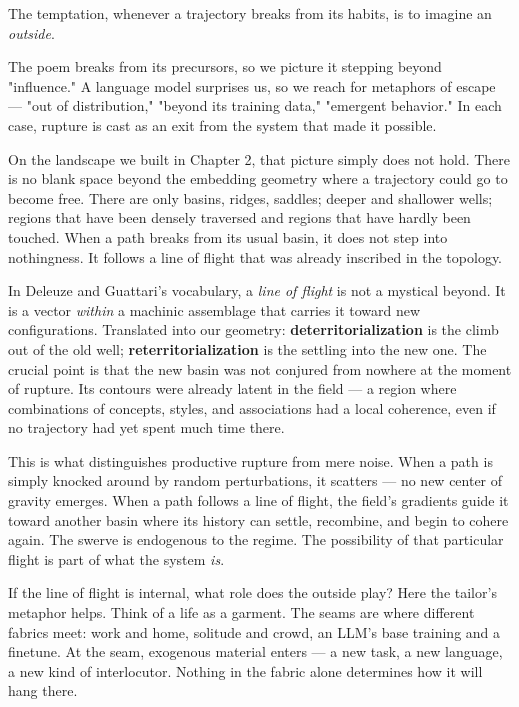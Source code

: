 \documentclass[12pt,a4paper]{article}
\begin{document}
The temptation, whenever a trajectory breaks from its habits, is to imagine an \textit{outside}.

The poem breaks from its precursors, so we picture it stepping beyond "influence." A language model surprises us, so we reach for metaphors of escape --- "out of distribution," "beyond its training data," "emergent behavior." In each case, rupture is cast as an exit from the system that made it possible.

On the landscape we built in Chapter 2, that picture simply does not hold. There is no blank space beyond the embedding geometry where a trajectory could go to become free. There are only basins, ridges, saddles; deeper and shallower wells; regions that have been densely traversed and regions that have hardly been touched. When a path breaks from its usual basin, it does not step into nothingness. It follows a line of flight that was already inscribed in the topology.

In Deleuze and Guattari's vocabulary, a \textit{line of flight} is not a mystical beyond. It is a vector \textit{within} a machinic assemblage that carries it toward new configurations. Translated into our geometry: \textbf{deterritorialization} is the climb out of the old well; \textbf{reterritorialization} is the settling into the new one. The crucial point is that the new basin was not conjured from nowhere at the moment of rupture. Its contours were already latent in the field --- a region where combinations of concepts, styles, and associations had a local coherence, even if no trajectory had yet spent much time there.

This is what distinguishes productive rupture from mere noise. When a path is simply knocked around by random perturbations, it scatters --- no new center of gravity emerges. When a path follows a line of flight, the field's gradients guide it toward another basin where its history can settle, recombine, and begin to cohere again. The swerve is endogenous to the regime. The possibility of that particular flight is part of what the system \textit{is}.

If the line of flight is internal, what role does the outside play? Here the tailor's metaphor helps. Think of a life as a garment. The seams are where different fabrics meet: work and home, solitude and crowd, an LLM's base training and a finetune. At the seam, exogenous material enters --- a new task, a new language, a new kind of interlocutor. Nothing in the fabric alone determines how it will hang there.
\end{document}
